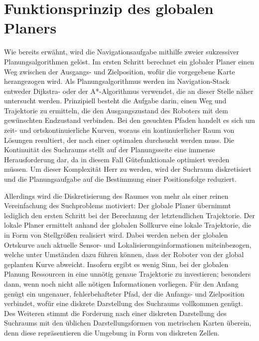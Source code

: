 \chapter{Funktionsprinzip des globalen Planers}
Wie bereits erwähnt, wird die Navigationsaufgabe mithilfe zweier sukzessiver Planungsalgorithmen gelöst. Im ersten Schritt berechnet ein globaler Planer einen Weg zwischen der Ausgangs- und Zielposition, wofür die vorgegebene Karte herangezogen wird. Als Planungsalgorithmus werden im Navigation-Stack entweder Dijkstra- oder der A*-Algorithmus verwendet, die an dieser Stelle näher untersucht werden. Prinzipiell besteht die Aufgabe darin, einen Weg und Trajektorie zu ermitteln, die den Ausgangszustand des Roboters mit dem gewünschten Endzustand verbinden. Bei den gesuchten Pfaden handelt es sich um zeit- und ortskontinuierliche Kurven, woraus ein kontinuierlicher Raum von Lösungen resultiert, der nach einer optimalen durchsucht werden muss. Die Kontinuität des Suchraums stellt auf der Planungsseite eine immense Herausforderung dar, da in diesem Fall Gütefunktionale optimiert werden müssen. Um dieser Komplexität Herr zu werden, wird der Suchraum diskretisiert und die Planungsaufgabe auf die Bestimmung einer Positionsfolge reduziert.

Allerdings wird die Diskretisierung des Raumes von mehr als einer reinen Vereinfachung des Suchproblems motiviert: Der globale Planer übernimmt lediglich den ersten Schritt bei der Berechnung der letztendlichen Trajektorie. Der lokale Planer ermittelt anhand der globalen Sollkurve eine lokale Trajektorie, die in Form von Stellgrößen realisiert wird. Dabei werden neben der globalen Ortskurve auch aktuelle Sensor- und Lokalisierungsinformationen miteinbezogen, welche unter Umständen dazu führen können, dass der Roboter von der global geplanten Kurve abweicht. Insofern ergibt es wenig Sinn, bei der globalen Planung Ressourcen in eine unnötig genaue Trajektorie zu investieren; besonders dann, wenn noch nicht alle nötigen Informationen vorliegen. Für den Anfang genügt ein ungenauer, fehlerbehafteter Pfad, der die Anfangs- und Zielposition verbindet, wofür eine diskrete Darstellung des Suchraums vollkommen genügt. Des Weiteren stimmt die Forderung nach einer diskreten Darstellung des Suchraums mit den üblichen Darstellungsformen von metrischen Karten überein, denn diese repräsentieren die Umgebung in Form von diskreten Zellen.

